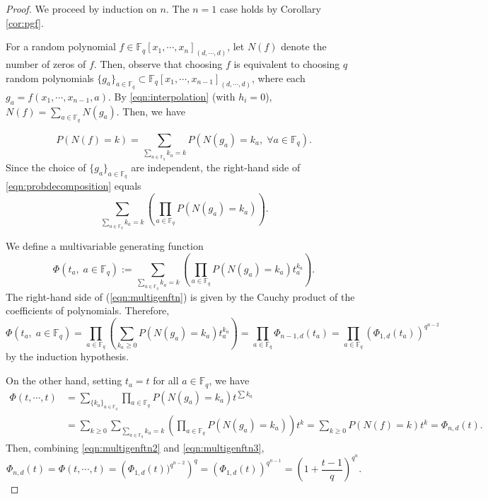 \documentclass[12pt]{amsart}
\theoremstyle{definition}
\newcommand{\FF}{\mathbb{F} }
\begin{document}
\begin{proof}
We proceed by induction on $n$. The $n = 1$ case holds by Corollary \ref{cor:pgf}.

For a random polynomial $f \in \FF_q[x_1, \cdots, x_n]_{(d, \cdots, d)}$, let $N(f)$ denote the number of zeros of $f$. Then, observe that choosing $f$ is equivalent to choosing $q$ random polynomials $\{g_a\}_{a \in \FF_q} \subset \FF_q[x_1, \cdots, x_{n-1}]_{(d, \cdots, d)}$, where each $g_a = f(x_1, \cdots, x_{n-1}, a)$. By \eqref{eqn:interpolation} (with $h_i = 0$), $N(f) = \sum_{a \in \FF_q}N(g_a)$. Then, we have

\begin{equation}\label{eqn:probdecomposition}
    P(N(f) = k) = \sum_{\sum_{a \in \FF_q} k_a =k}P(N(g_a) = k_a, \; \forall a \in \FF_q).
\end{equation}
Since the choice of $\{g_a\}_{a \in \FF_q}$ are independent, the right-hand side of \eqref{eqn:probdecomposition} equals 
\[
    \sum_{\sum_{a \in \FF_q}k_a=k}\left(\prod_{a \in \FF_q}P(N(g_a) = k_a)\right).
\]

We define a multivariable generating function
\begin{equation}\label{eqn:multigenftn}
    \Phi(t_a, \;a \in \FF_q) := 
    \sum_{\sum_{a \in \FF_q}k_a = k} \left(\prod_{a \in \FF_q}P(N(g_a) = k_a)t_a^{k_a}\right).
\end{equation}
The right-hand side of (\ref{eqn:multigenftn}) is given by the Cauchy product of the coefficients of polynomials. Therefore, 
\begin{equation}\label{eqn:multigenftn2}
    \Phi(t_a, \;a \in \FF_q) = 
    \prod_{a \in \FF_q}\left(\sum_{k_a \ge 0} P(N(g_a) = k_a) t_a^{k_a}\right)
    = \prod_{a \in \FF_q}\Phi_{n-1,d}(t_a)
    = \prod_{a \in \FF_q}(\Phi_{1,d}(t_a))^{q^{n-2}}
\end{equation}
by the induction hypothesis. 

On the other hand, setting $t_a = t$ for all $a \in \FF_q$, we have 
\begin{equation}\label{eqn:multigenftn3}
\begin{split}
    \Phi(t, \cdots, t) &= \sum_{\{k_a\}_{a \in \FF_q}}
    \prod_{a \in \FF_q}P(N(g_a) = k_a)t^{\sum k_a}\\
    &= \sum_{k \ge 0}\sum_{\sum_{a \in \FF_q} k_a = k} \left(\prod_{a \in \FF_q}P(N(g_a) = k_a)\right) t^k
    = \sum_{k \ge 0}P(N(f) = k)t^k = \Phi_{n,d}(t).
\end{split}
\end{equation}
Then, combining \eqref{eqn:multigenftn2} and \eqref{eqn:multigenftn3}, 
\[
    \Phi_{n,d}(t) = \Phi(t, \cdots, t) = \left(\Phi_{1,d}(t))^{q^{n-2}}\right)^{q} = (\Phi_{1,d}(t))^{q^{n-1}} = \left(1+\frac{t-1}{q}\right)^{q^n}.
\]
\end{proof}
\end{document}
